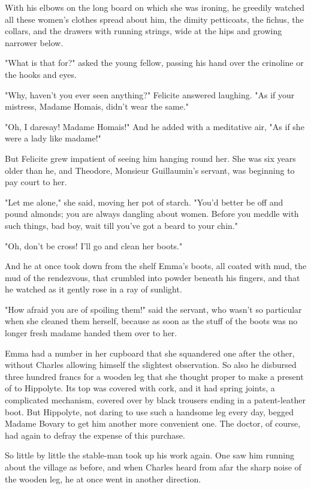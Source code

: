 \documentclass[11pt,twocolumn]{ltugboat}
\begin{document}
With his elbows on the long board on which she was ironing, he
greedily watched all these women's clothes spread about him, the dimity
petticoats, the fichus, the collars, and the drawers with running
strings, wide at the hips and growing narrower below.

"What is that for?" asked the young fellow, passing his hand over the
crinoline or the hooks and eyes.

"Why, haven't you ever seen anything?" Felicite answered laughing. "As
if your mistress, Madame Homais, didn't wear the same."

"Oh, I daresay! Madame Homais!" And he added with a meditative air, "As
if she were a lady like madame!"

But Felicite grew impatient of seeing him hanging round her. She was six
years older than he, and Theodore, Monsieur Guillaumin's servant, was
beginning to pay court to her.

"Let me alone," she said, moving her pot of starch. "You'd better be
off and pound almonds; you are always dangling about women. Before you
meddle with such things, bad boy, wait till you've got a beard to your
chin."

"Oh, don't be cross! I'll go and clean her boots."

And he at once took down from the shelf Emma's boots, all coated with
mud, the mud of the rendezvous, that crumbled into powder beneath his
fingers, and that he watched as it gently rose in a ray of sunlight.

"How afraid you are of spoiling them!" said the servant, who wasn't so
particular when she cleaned them herself, because as soon as the stuff
of the boots was no longer fresh madame handed them over to her.

Emma had a number in her cupboard that she squandered one after the
other, without Charles allowing himself the slightest observation. So
also he disbursed three hundred francs for a wooden leg that she thought
proper to make a present of to Hippolyte. Its top was covered with cork,
and it had spring joints, a complicated mechanism, covered over by black
trousers ending in a patent-leather boot. But Hippolyte, not daring
to use such a handsome leg every day, begged Madame Bovary to get him
another more convenient one. The doctor, of course, had again to defray
the expense of this purchase.

So little by little the stable-man took up his work again. One saw him
running about the village as before, and when Charles heard from afar
the sharp noise of the wooden leg, he at once went in another direction.
\end{document}
